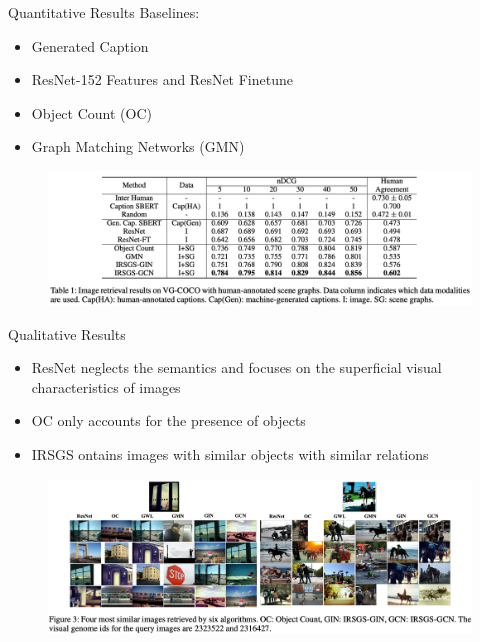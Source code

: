 \documentclass{beamer}
\begin{document}
\begin{frame}{Quantitative Results}
Baselines: 
    \begin{itemize}
        \item Generated Caption
        \item ResNet-152 Features and ResNet Finetune
        \item Object Count (OC)
        \item Graph Matching Networks (GMN)
    \end{itemize}
\begin{figure}[htpb]
    \centering
    \includegraphics[width=\linewidth]{pic/Retrieval/table1.png}
\end{figure}
\end{frame}

\begin{frame}{Qualitative Results}
\begin{itemize}
    \item ResNet neglects the semantics and focuses on the superficial visual characteristics of images
    \item OC only accounts for the presence of objects
    \item IRSGS ontains images with similar objects with similar relations 
\end{itemize}
\begin{figure}[htpb]
    \centering
    \includegraphics[width=\linewidth]{pic/Retrieval/figure3.png}
\end{figure}
\end{frame}
\end{document}
